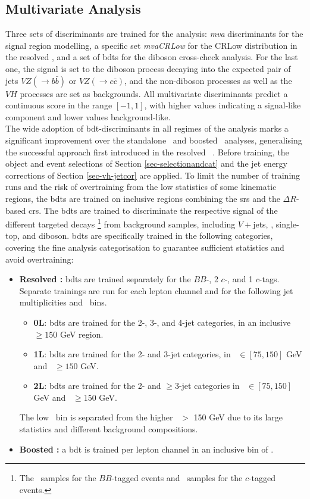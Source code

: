 \subsection{Multivariate Analysis}
Three sets of discriminants are trained for the analysis: \textit{\gls{mva}} discriminants for the signal region modelling, a specific set \textit{mvaCRLow} for the CRLow distribution in the resolved \vhb, and a set of \glspl{bdt} for the diboson cross-check analysis. For the last one, the signal is set to the diboson process decaying into the expected pair of jets $VZ(\rightarrow b\bar{b})$ or $VZ(\rightarrow c\bar{c})$, and the non-diboson processes as well as the $VH$ processes are set as backgrounds. All multivariate discriminants predict a continuous score in the range $[-1, 1]$, with higher values indicating a signal-like component and lower values background-like.\\

The wide adoption of \gls{bdt}-discriminants in all regimes of the analysis marks a significant improvement over the standalone \vhc\ and boosted \vhb\ analyses, generalising the successful approach first introduced in the resolved \vhb\ \cite{ATLAS:2020fcp}. Before training, the object and event selections of Section \ref{sec-selectionandcat} and the jet energy corrections of Section \ref{sec-vh-jetcor} are applied. To limit the number of training runs and the risk of overtraining from the low statistics of some kinematic regions, the \glspl{bdt} are trained on inclusive regions combining the \glspl{sr} and the $\Delta R$-based \glspl{cr}. The \glspl{bdt} are trained to discriminate the respective signal of the different targeted decays \footnote{The \vhb\ samples for the $BB$-tagged events and \vhc\ samples for the $c$-tagged events.} from background samples, including $V+$jets, \ttb, single-top, and diboson. \glspl{bdt} are specifically trained in the following categories, covering the fine analysis categorisation to guarantee sufficient statistics and avoid overtraining:
\begin{itemize}[leftmargin=*]
  \item \textbf{Resolved \boldvhbc:} \glspl{bdt} are trained separately for the $BB$-, 2 $c$-, and 1 $c$-tags. Separate trainings are run for each lepton channel and for the following jet multiplicities and \ptv\ bins.
  \begin{itemize}
      \item \textbf{0L}: \glspl{bdt} are trained for the 2-, 3-, and 4-jet categories, in an inclusive \ptv\ $\geq 150$ GeV region.
      \item \textbf{1L}: \glspl{bdt} are trained for the 2- and 3-jet categories, in \ptv\ $\in [75, 150]$ GeV and \ptv\ $\geq 150$ GeV.
      \item \textbf{2L}: \glspl{bdt} are trained for the 2- and $\geq$3-jet categories in \ptv\ $\in [75, 150]$ GeV and \ptv\ $\geq 150$ GeV.
  \end{itemize}
  The low \ptv\ bin is separated from the higher \ptv\ $>$ 150 GeV due to its large statistics and different background compositions.
  \item \textbf{Boosted \boldvhbc:} a \gls{bdt} is trained per lepton channel in an inclusive bin of \ptv.
\end{itemize}

